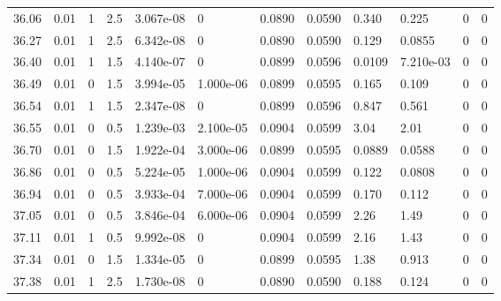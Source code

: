\documentclass[preview]{standalone}
\begin{document}
{{{{{{{\begin{tabular}{L{1.2cm}C{1.2cm} C{0.3cm}C{0.5cm} C{1.4cm}C{1.4cm} C{1.4cm}C{1.4cm} C{1.6cm}C{1.6cm} C{1.6cm}C{1.6cm}}
  36.06  &  0.01  & 1     & 2.5 &  3.067e-08  & 0  &  0.0890&   0.0590& 0.340 & 0.225   &  0 & 0  \\ 
  36.27  &  0.01  & 1     & 2.5 &  6.342e-08  & 0  &  0.0890&   0.0590& 0.129 & 0.0855   &  0 & 0  \\ 
  36.40  &  0.01  & 1     & 1.5 &  4.140e-07  & 0  &  0.0899&   0.0596& 0.0109 & 7.210e-03   &  0 & 0  \\ 
  36.49  &  0.01  & 0     & 1.5 &  3.994e-05  & 1.000e-06  &  0.0899&   0.0595& 0.165 & 0.109   &  0 & 0  \\ 
  36.54  &  0.01  & 1     & 1.5 &  2.347e-08  & 0  &  0.0899&   0.0596& 0.847 & 0.561   &  0 & 0  \\ 
  36.55  &  0.01  & 0     & 0.5 &  1.239e-03  & 2.100e-05  &  0.0904&   0.0599& 3.04 & 2.01   &  0 & 0  \\ 
  36.70  &  0.01  & 0     & 1.5 &  1.922e-04  & 3.000e-06  &  0.0899&   0.0595& 0.0889 & 0.0588   &  0 & 0  \\ 
  36.86  &  0.01  & 0     & 0.5 &  5.224e-05  & 1.000e-06  &  0.0904&   0.0599& 0.122 & 0.0808   &  0 & 0  \\ 
  36.94  &  0.01  & 0     & 0.5 &  3.933e-04  & 7.000e-06  &  0.0904&   0.0599& 0.170 & 0.112   &  0 & 0  \\ 
  37.05  &  0.01  & 0     & 0.5 &  3.846e-04  & 6.000e-06  &  0.0904&   0.0599& 2.26 & 1.49   &  0 & 0  \\ 
  37.11  &  0.01  & 1     & 0.5 &  9.992e-08  & 0  &  0.0904&   0.0599& 2.16 & 1.43   &  0 & 0  \\ 
  37.34  &  0.01  & 0     & 1.5 &  1.334e-05  & 0  &  0.0899&   0.0595& 1.38 & 0.913   &  0 & 0  \\ 
  37.38  &  0.01  & 1     & 2.5 &  1.730e-08  & 0  &  0.0890&   0.0590& 0.188 & 0.124   &  0 & 0  \\ 
\hline 
\end{tabular} 

}}}}}}}
\end{document}
